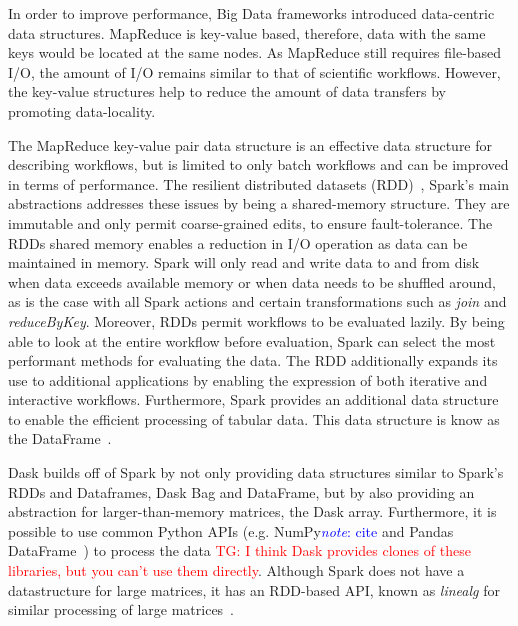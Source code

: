 \documentclass{report}
\newcommand{\note}[1]{\textcolor{blue}{\textit{note}: #1}}
\newcommand{\tristan}[1]{\textcolor{red}{TG: #1}}
\begin{document}
                In order to improve performance, Big Data frameworks introduced
                data-centric data structures. MapReduce is key-value based, 
                therefore, data with the same keys would be located at the
                same nodes. As MapReduce still requires file-based I/O, the 
                amount of I/O remains similar to that of scientific workflows. 
                However, the key-value structures help to reduce the amount 
                of data transfers by promoting data-locality.

                The MapReduce key-value pair data structure is an effective 
                data structure for describing workflows, but is limited to only
                batch workflows and can be improved in terms of performance. 
                The resilient distributed datasets 
                (RDD)~\cite{Zaharia:2012:RDD:2228298.2228301}, Spark's main
                abstractions addresses these 
                issues by being a shared-memory structure. They 
                are immutable and only permit coarse-grained edits, to ensure 
                fault-tolerance. The RDDs shared memory enables a reduction in
                I/O operation as data can be maintained in memory. Spark will only read 
                and write data to and from disk when data exceeds available 
                memory or when data needs to be shuffled around, as is the case
                with all Spark actions and certain transformations such as 
                \textit{join} and \textit{reduceByKey}. Moreover, RDDs permit
                workflows to be evaluated lazily. By being able to look at the
                entire workflow before evaluation, Spark can select the most
                performant methods for evaluating the data. 
                The RDD additionally expands its use to additional applications
                by enabling the expression of both iterative and interactive
                workflows. Furthermore, Spark provides an additional data 
                structure to enable the efficient processing of tabular data.
                This data structure is know as the 
                DataFrame~\cite{Armbrust:2015:SSR:2723372.2742797}.

                Dask builds off of Spark by not only providing data 
                structures similar to Spark's RDDs and Dataframes, Dask Bag and 
                DataFrame, but by also providing an abstraction for 
                larger-than-memory matrices, the Dask array. Furthermore, it is
                possible to use common Python APIs (e.g. NumPy\note{cite} and 
                Pandas DataFrame~\cite{mckinney2011pandas}) to process the 
                data \tristan{I think Dask provides clones of these libraries, but you can't use
            them directly}. Although Spark does not have a datastructure for large 
                matrices, it has an RDD-based API, known as \textit{linealg}
                for similar processing of large 
                matrices~\cite{BosaghZadeh:2016:MCO:2939672.2939675}.
\end{document}
